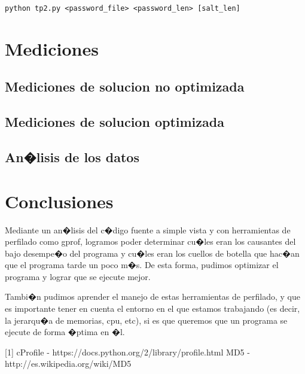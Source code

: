 \documentclass[a4paper,10pt,oneside]{article}
\begin{document}
\begin{center} \texttt{python tp2.py <password\_file> <password\_len> [salt\_len]} \end{center}

\section{Mediciones}

\subsection{Mediciones de solucion no optimizada}

\newpage

\subsection{Mediciones de solucion optimizada}


\subsection{An�lisis de los datos}
	
\newpage	
\section{Conclusiones}	
Mediante un an�lisis del c�digo fuente a simple vista y con herramientas de perfilado como gprof, logramos poder determinar cu�les eran los causantes del bajo desempe�o del programa y cu�les eran los cuellos de botella que hac�an que el programa tarde un poco m�s. De esta forma, pudimos optimizar el programa y lograr que se ejecute mejor.

Tambi�n pudimos aprender el manejo de estas herramientas de perfilado, y que es importante tener en cuenta el entorno en el que estamos trabajando (es decir, la jerarqu�a de memorias, cpu, etc), si es que queremos que un programa se ejecute de forma �ptima en �l.

	
\begin{thebibliography}{99}

[1] cProfile - https://docs.python.org/2/library/profile.html             
\newline	
[2] MD5 - http://es.wikipedia.org/wiki/MD5 \\

\end{thebibliography}
\end{document}
